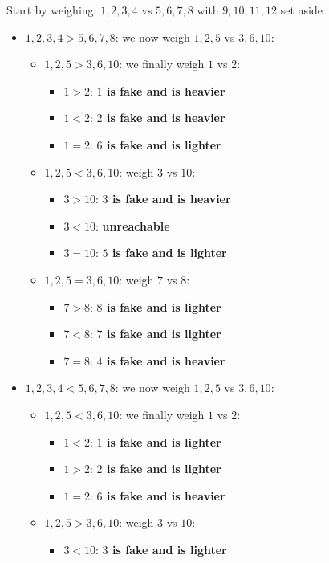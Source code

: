 \begin{problem}
Start by weighing: $1,2,3,4$ vs $5,6,7,8$ with $9,10,11,12$ set aside 
\begin{itemize}
\item $1,2,3,4 > 5,6,7,8$: we now weigh $1,2,5$ vs $3,6,10$:
	\begin{itemize}
		\item $1,2,5 > 3,6,10$: we finally weigh $1$ vs $2$:
			\begin{itemize}
				\item $1>2$: \textbf{$1$ is fake and is heavier}
				\item $1<2$: \textbf{$2$ is fake and is heavier}
				\item $1=2$: \textbf{$6$ is fake and is lighter}
			\end{itemize}
		\item $1,2,5 < 3,6,10$: weigh $3$ vs $10$:
			\begin{itemize}
				\item $3>10$: \textbf{$3$ is fake and is heavier}
				\item $3<10$: \textbf{unreachable}
				\item $3=10$: \textbf{$5$ is fake and is lighter}
			\end{itemize}	
		\item $1,2,5 = 3,6,10$: weigh $7$ vs $8$:
			\begin{itemize}
				\item $7>8$: \textbf{$8$ is fake and is lighter}
				\item $7<8$: \textbf{$7$ is fake and is lighter}
				\item $7=8$: \textbf{$4$ is fake and is heavier}
			\end{itemize}	
	\end{itemize} 
\item $1,2,3,4 < 5,6,7,8$: we now weigh $1,2,5$ vs $3,6,10$:
	\begin{itemize}
		\item $1,2,5 < 3,6,10$: we finally weigh $1$ vs $2$:
			\begin{itemize}
				\item $1<2$: \textbf{$1$ is fake and is lighter}
				\item $1>2$: \textbf{$2$ is fake and is lighter}
				\item $1=2$: \textbf{$6$ is fake and is heavier}
			\end{itemize}
		\item $1,2,5 > 3,6,10$: weigh $3$ vs $10$:
			\begin{itemize}
				\item $3<10$: \textbf{$3$ is fake and is lighter}

\end{itemize}
\end{itemize}
\end{itemize}
\end{problem}
